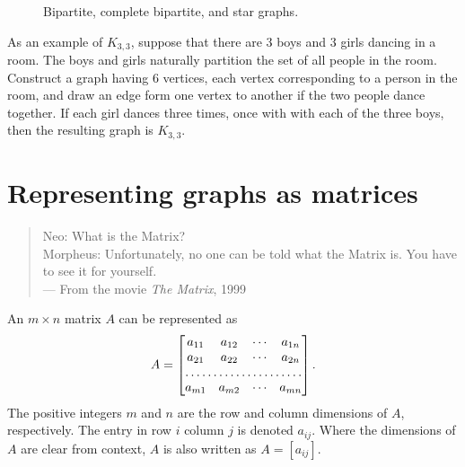 \begin{figure}[!htbp]
\centering
{}

\caption{Bipartite, complete bipartite, and star graphs.}
\label{fig:introduction:bipartite_complete_bipartite_graphs}
\end{figure}

As an example of $K_{3,3}$, suppose that there are $3$ boys and $3$
girls dancing in a room. The boys and girls naturally partition the
set of all people in the room. Construct a graph having $6$ vertices,
each vertex corresponding to a person in the room, and draw an edge
form one vertex to another if the two people dance together. If each
girl dances three times, once with with each of the three boys, then
the resulting graph is $K_{3,3}$.



\section{Representing graphs as matrices}
\label{sec:introduction:matrix_representation}

\begin{quote}
\footnotesize
Neo: What is the Matrix? \\
Morpheus: Unfortunately, no one can be told what the Matrix is. You
have to see it for yourself. \\
\noindent
--- From the movie \emph{The Matrix}, 1999
\end{quote}

\noindent
An $m \times n$ matrix $A$ can be represented as
\[
A
=
\begin{bmatrix}
a_{11} & a_{12} & \cdots & a_{1n} \\
a_{21} & a_{22} & \cdots & a_{2n} \\
\hdotsfor{4} \\
a_{m1} & a_{m2} & \cdots & a_{mn} \\
\end{bmatrix}.
\]
The positive integers $m$ and $n$ are the row and column dimensions of
$A$, respectively. The entry in row $i$ column $j$ is denoted
$a_{ij}$. Where the dimensions of $A$ are clear from context, $A$ is
also written as $A = [a_{ij}]$.

